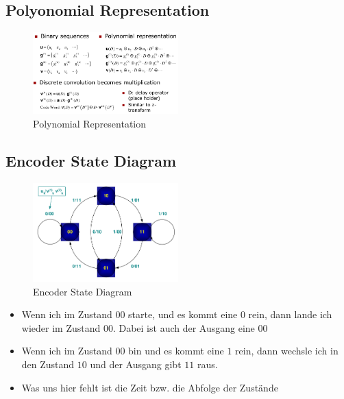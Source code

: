 \hypertarget{polyonomial-representation}{%
\subsection{Polyonomial
Representation}\label{polyonomial-representation}}

\begin{figure}[H]
\centering
\includegraphics[width=0.5\textwidth]{figures/convolutional_polynomial.png}
\caption{Polynomial Representation}
\end{figure}

\hypertarget{encoder-state-diagram}{%
\subsection{Encoder State Diagram}\label{encoder-state-diagram}}

\begin{figure}[H]
\centering
\includegraphics[width=0.5\textwidth]{figures/encoder_state_diagram.png}
\caption{Encoder State Diagram}
\end{figure}

\begin{itemize}
\tightlist
\item
  Wenn ich im Zustand $00$ starte, und es kommt eine $0$ rein, dann lande
  ich wieder im Zustand $00$. Dabei ist auch der Ausgang eine $00$
\item
  Wenn ich im Zustand $00$ bin und es kommt eine $1$ rein, dann wechsle ich
  in den Zustand $10$ und der Ausgang gibt $11$ raus.
\item
  Was uns hier fehlt ist die Zeit bzw. die Abfolge der Zustände
\end{itemize}


